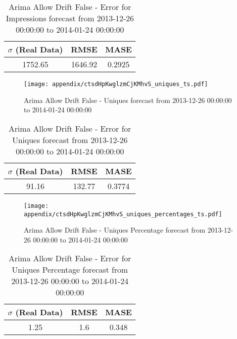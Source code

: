 \begin{table}[H]
\centering
\footnotesize
\begin{tabular}{ccc}
$\sigma$ (Real Data) & RMSE & MASE   \\ \hline
1752.65 & 1646.92 & 0.2925 \\
\end{tabular}

\vspace{0.5cm}

\caption{
Arima Allow Drift False - Error for Impressions forecast from 2013-12-26 00:00:00 to 2014-01-24 00:00:00}
\end{table}

\begin{figure}[H] \begin{center} \leavevmode
\texttt{[image: appendix/ctsdHpKwglzmCjKMhvS\_uniques\_ts.pdf]} \caption{
Arima Allow Drift False - Uniques forecast from 2013-12-26 00:00:00 to 2014-01-24 00:00:00} \label{fig:appendix/ctsdHpKwglzmCjKMhvS_uniques_ts.pdf} \end{center}
\end{figure}

\begin{table}[H]
\centering
\footnotesize
\begin{tabular}{ccc}
$\sigma$ (Real Data) & RMSE & MASE   \\ \hline
91.16 & 132.77 & 0.3774 \\
\end{tabular}

\vspace{0.5cm}

\caption{
Arima Allow Drift False - Error for Uniques forecast from 2013-12-26 00:00:00 to 2014-01-24 00:00:00}
\end{table}

\begin{figure}[H] \begin{center} \leavevmode
\texttt{[image: appendix/ctsdHpKwglzmCjKMhvS\_uniques\_percentages\_ts.pdf]} \caption{
Arima Allow Drift False - Uniques Percentage forecast from 2013-12-26 00:00:00 to 2014-01-24 00:00:00} \label{fig:appendix/ctsdHpKwglzmCjKMhvS_uniques_percentages_ts.pdf} \end{center}
\end{figure}

\begin{table}[H]
\centering
\footnotesize
\begin{tabular}{ccc}
$\sigma$ (Real Data) & RMSE & MASE   \\ \hline
1.25 & 1.6 & 0.348 \\
\end{tabular}

\vspace{0.5cm}

\caption{
Arima Allow Drift False - Error for Uniques Percentage forecast from 2013-12-26 00:00:00 to 2014-01-24 00:00:00}
\end{table}

